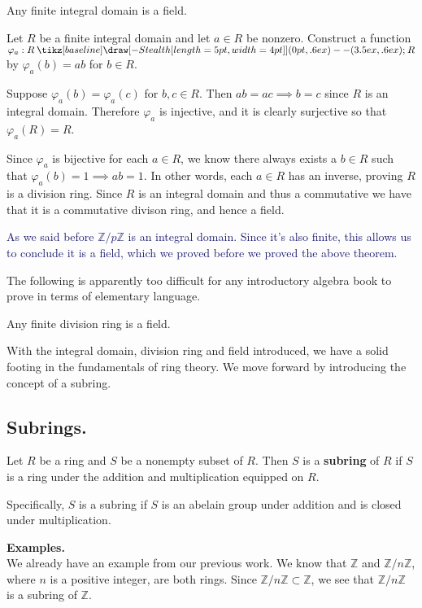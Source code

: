 \documentclass[12pt,letterpaper]{algebra_book}
\renewcommand{\to}{\mathbin{\tikz[baseline] \draw[-{Stealth[length=5pt,width=4pt]}] (0pt,.6ex) -- (3.5ex,.6ex);}}
\newcommand{\ZZ}{\mathbb{Z}}
\renewcommand{\phi}{\varphi}
\theoremstyle{definition}
\begin{document}
    \begin{thm}
        Any finite integral domain is a field.
    \end{thm}

    \begin{prf}
        Let $R$ be a finite integral domain and let $a \in R$ be nonzero.
        Construct a function $\phi_a: R \to R$ by $\phi_a(b) = ab$
        for $b \in R$. 

        Suppose $\phi_a(b) = \phi_a(c)$ for $b, c \in R$. Then $ab
        = ac \implies b = c$ since $R$ is an integral domain.
        Therefore $\phi_a$ is injective, and it is clearly
        surjective so that $\phi_a(R) = R$.
        
        Since $\phi_a$ is bijective for each $a \in R$, we know 
        there always exists a $b \in R$ such that $\phi_a(b) = 1
        \implies ab = 1$. In other words, each $a \in R$ has an
        inverse, proving $R$ is a division ring. Since $R$ is an
        integral domain and thus a commutative we have that it is a
        commutative divison ring, and hence a field.
    \end{prf}

    \textcolor{MidnightBlue}{As we said before $\ZZ/p\ZZ$ is an
    integral domain. Since it's also finite, this allows us to
    conclude it is a field, which we proved before we proved the
    above theorem.}

    The following is apparently too difficult for any
    introductory algebra book to prove in terms of elementary language.
    \begin{thm}
        Any finite division ring is a field.
    \end{thm}

    With the integral domain, division ring and field introduced,
    we have a solid footing in the fundamentals of ring theory. We
    move forward by introducing the concept of a subring.

    \subsection*{Subrings.}
    
    \begin{definition}
        Let $R$ be a ring and $S$ be a nonempty subset of $R$.
        Then $S$ is a \textbf{subring} of $R$ if $S$ is a ring under the
        addition and multiplication equipped on $R$. 

        Specifically, $S$ is a subring if $S$ is an abelain group
        under addition and is closed under multiplication.
    \end{definition}
    \noindent
    \textbf{Examples.}\\
    We already have an example from our previous work. We know
    that $\ZZ$ and $\ZZ/n\ZZ$, where $n$ is a positive integer,
    are both rings. Since $\ZZ/n\ZZ \subset \ZZ$, we see that
    $\ZZ/n\ZZ$ is a subring of $\ZZ$. 
    \\
\end{document}
